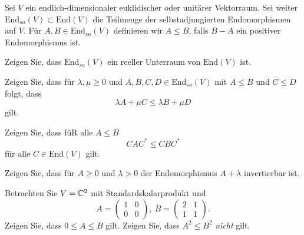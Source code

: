 \begin{PRoblem}
	Sei $V$ ein endlich-dimensionaler euklidischer oder unitärer Vektorraum. Sei weiter $\text{End}_{sa}(V)\subset \text{End}(V)$ die Teilmenge der selbstadjungierten Endomorphismen auf $V$. F\"{u}r $A,B\in \text{End}_{sa}(V)$ definieren wir $A\le B$, falls $B-A$ ein positiver Endomorphismus ist.
	\begin{parts}
	\item Zeigen Sie, dass $\text{End}_{sa}(V)$ ein reeller Unterraum von $\text{End}(V)$ ist.
	\item Zeigen Sie, dass f\"{u}r $\lambda,\mu\ge 0$ und $A,B,C,D\in \text{End}_{sa}(V)$ mit $A\le B$ und $C\le D$ folgt, dass
		\[
		\lambda A+\mu C\le \lambda B+\mu D
	\]
	gilt.
\item Zeigen Sie, dass f\"{u}R alle $A\le B$ 
	\[
	CAC^*\le CBC^*
\]
f\"{u}r alle $C\in \text{End}(V)$ gilt.
\item Zeigen Sie, dass f\"{u}r $A\ge 0$ und $\lambda>0$ der Endomorphismus $A+\lambda$ invertierbar ist.
\item Betrachten Sie $V=\mathbb{C}^2$ mit Standardskalarprodukt und
	\[
		A=\begin{pmatrix} 1 & 0 \\ 0 & 0 \end{pmatrix} ,~B=\begin{pmatrix} 2 & 1 \\ 1 & 1 \end{pmatrix} 
	.\]
	Zeigen Sie, dass $0\le A \le B$ gilt. Zeigen Sie, dass $A^2\le B^2$ \emph{nicht} gilt.
	\end{parts}
\end{PRoblem}
